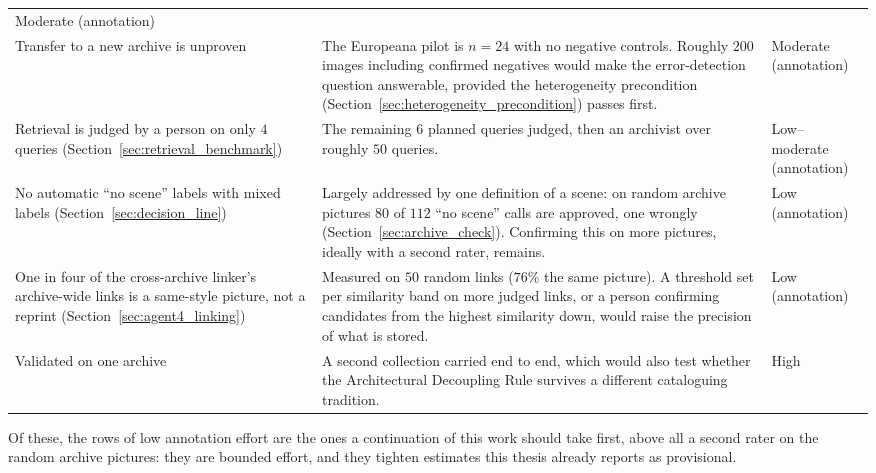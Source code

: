\documentclass[12pt,a4paper]{report}
\begin{document}
\begin{table}[!htbp]
\begin{tabular}{>{\raggedright\arraybackslash}p{3.9cm} >{\raggedright\arraybackslash}p{7.3cm} >{\raggedright\arraybackslash}p{2.2cm}}
Moderate (annotation) \\
\addlinespace
Transfer to a new archive is unproven &
The Europeana pilot is $n=24$ with no negative controls. Roughly $200$ images including confirmed negatives would make the error-detection question answerable, provided the heterogeneity precondition (Section~\ref{sec:heterogeneity_precondition}) passes first. &
Moderate (annotation) \\
\addlinespace
Retrieval is judged by a person on only $4$ queries (Section~\ref{sec:retrieval_benchmark}) &
The remaining $6$ planned queries judged, then an archivist over roughly $50$ queries. &
Low--moderate (annotation) \\
\addlinespace
No automatic ``no scene'' labels with mixed labels (Section~\ref{sec:decision_line}) &
Largely addressed by one definition of a scene: on random archive pictures $80$ of $112$ ``no scene'' calls are approved, one wrongly (Section~\ref{sec:archive_check}). Confirming this on more pictures, ideally with a second rater, remains. &
Low (annotation) \\
\addlinespace
One in four of the cross-archive linker's archive-wide links is a same-style picture, not a reprint (Section~\ref{sec:agent4_linking}) &
Measured on $50$ random links ($76\%$ the same picture). A threshold set per similarity band on more judged links, or a person confirming candidates from the highest similarity down, would raise the precision of what is stored. &
Low (annotation) \\
\addlinespace
Validated on one archive &
A second collection carried end to end, which would also test whether the Architectural Decoupling Rule survives a different cataloguing tradition. &
High \\
\bottomrule
\end{tabular}
\end{table}

Of these, the rows of low annotation effort are the ones a continuation of this work should take first, above all a second rater on the random archive pictures: they are bounded effort, and they tighten estimates this thesis already reports as provisional.
\end{document}

